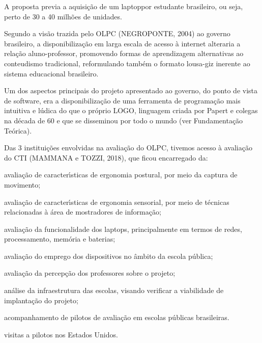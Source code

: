 \documentclass[
12pt,		%
openright,	%
twoside,  %
a4paper,			%
chapter=TITLE,		%
english,			%
french,				%
spanish,			%
brazil				%
]{USPSC-classe/USPSC}
\begin{document}
A proposta previa a aquisi\c{c}\~ao de um \textquotedbl laptop\textquotedbl  por estudante brasileiro, ou seja, perto de 30 a 40 milh\~oes de unidades.










Segundo a vis\~ao trazida pelo OLPC  (NEGROPONTE, 2004) ao governo brasileiro, a disponibiliza\c{c}\~ao em larga escala de acesso \`a internet alteraria a rela\c{c}\~ao aluno-professor, promovendo formas de aprendizagem alternativas ao conteudismo tradicional, reformulando tamb\'em o formato lousa-giz inerente ao sistema educacional brasileiro.










Um dos aspectos principais do projeto apresentado ao governo, do ponto de vista de software, era a disponibiliza\c{c}\~ao de uma ferramenta de programa\c{c}\~ao mais intuitiva e l\'udica do que o pr\'oprio LOGO, linguagem criada por Papert e colegas na d\'ecada de 60 e que se disseminou por todo o mundo (ver Fundamenta\c{c}\~ao Te\'orica).










Das 3 institui\c{c}\~oes envolvidas na avalia\c{c}\~ao do OLPC, tivemos acesso \`a avalia\c{c}\~ao do CTI  (MAMMANA e TOZZI, 2018), que ficou encarregado da:











\begin{alineas}
\item avalia\c{c}\~ao de caracter\'{\i}sticas de ergonomia postural, por meio da captura de movimento;
\item avalia\c{c}\~ao de caracter\'{\i}sticas de ergonomia sensorial, por meio de t\'ecnicas relacionadas \`a \'area de mostradores de informa\c{c}\~ao;
\item avalia\c{c}\~ao da funcionalidade dos \textquotedbl laptops\textquotedbl , principalmente em termos de redes, processamento, mem\'oria e baterias;
\item avalia\c{c}\~ao do emprego dos dispositivos no \^ambito da escola p\'ublica;
\item avalia\c{c}\~ao da percep\c{c}\~ao dos professores sobre o projeto;
\item an\'alise da infraestrutura das escolas, visando verificar a viabilidade de implanta\c{c}\~ao do projeto;
\item acompanhamento de pilotos de avalia\c{c}\~ao em escolas p\'ublicas brasileiras.
\item visitas a pilotos nos Estados Unidos.
\end{alineas}
\end{document}
